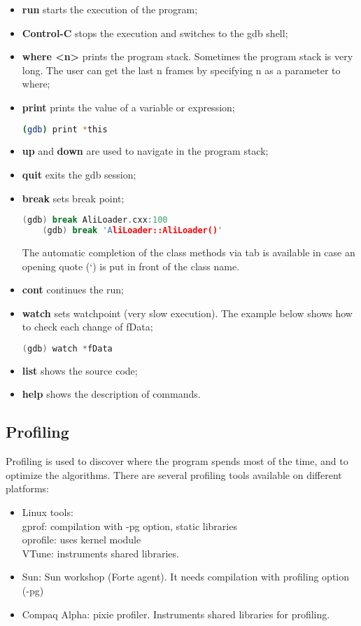 \documentclass[12pt,a4paper,twoside]{article}
\begin{document}
\begin{itemize}
\item \textbf{run} starts the execution of the program;
\item \textbf{Control-C} stops the execution and switches to the gdb shell;
\item \textbf{where <n>} prints the program stack. Sometimes the program
  stack is very long. The user can get the last n frames by specifying
  n as a parameter to where;
\item \textbf{print} prints the value of a variable or expression;

  \begin{lstlisting}[language=sh]
    (gdb) print *this
  \end{lstlisting}
\item \textbf{up} and \textbf{down} are used to navigate in the program stack;
\item \textbf{quit} exits the gdb session;
\item \textbf{break} sets break point;

  \begin{lstlisting}[language=C++]
    (gdb) break AliLoader.cxx:100
    (gdb) break 'AliLoader::AliLoader()'
  \end{lstlisting}

  The automatic completion of the class methods via tab is available
  in case an opening quote (`) is put in front of the class name.

\item \textbf{cont} continues the run;
\item \textbf{watch} sets watchpoint (very slow execution). The example below
  shows how to check each change of fData;
  
  \begin{lstlisting}[language=C++]
    (gdb) watch *fData
  \end{lstlisting}
\item \textbf{list} shows the source code;
\item \textbf{help} shows the description of commands.
\end{itemize}


\subsection{Profiling}

Profiling is used to discover where the program spends most of the
time, and to optimize the algorithms. There are several profiling
tools available on different platforms:
\begin{itemize}
\item Linux tools:\\
  gprof: compilation with -pg option, static libraries\\
  oprofile: uses kernel module\\
  VTune: instruments shared libraries.
\item Sun: Sun workshop (Forte agent). It needs compilation with
  profiling option (-pg) 
\item Compaq Alpha: pixie profiler. Instruments shared libraries for profiling.
\end{itemize}
\end{document}
